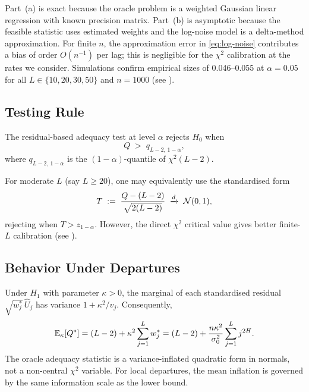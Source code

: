 \begin{remark}
    Part~(a) is exact because the oracle problem is a weighted Gaussian linear
    regression with known precision matrix.  Part~(b) is asymptotic because
    the feasible statistic uses estimated weights and the log-noise model is a
    delta-method approximation.  For finite $n$, the approximation error in
    \eqref{eq:log-noise} contributes a bias of order $O(n^{-1})$ per lag;
    this is negligible for the $\chi^2$ calibration at the rates we consider.
    Simulations confirm empirical sizes of 0.046--0.055 at $\alpha = 0.05$
    for all $L \in \{10,20,30,50\}$ and $n = 1000$ (see ).
\end{remark}

\subsection{Testing Rule}

The residual-based adequacy test at level $\alpha$ rejects $H_0$ when
\begin{equation}
    Q \;>\; q_{L-2,\,1-\alpha},
    \label{eq:test-rule}
\end{equation}
where $q_{L-2,\,1-\alpha}$ is the $(1-\alpha)$-quantile of $\chi^2(L-2)$.

For moderate $L$ (say $L \geq 20$), one may equivalently use the
standardised form
\[
    T \;:=\; \frac{Q - (L-2)}{\sqrt{2(L-2)}} \;\xrightarrow{d}\; \mathcal{N}(0,1),
\]
rejecting when $T > z_{1-\alpha}$.  However, the direct $\chi^2$ critical
value gives better finite-$L$ calibration (see ).

\subsection{Behavior Under Departures}

\begin{proposition}
\label{prop:alternative-response}
Under $H_1$ with parameter $\kappa > 0$, the marginal of each standardised
residual $\sqrt{w_j^*}\,\widehat U_j$ has variance $1 + \kappa^2/v_j$.
Consequently,
\[
    \mathbb{E}_\kappa[Q^*]
    = (L-2) + \kappa^2 \sum_{j=1}^L w_j^*
    = (L-2) + \frac{n\kappa^2}{\sigma_0^2}\sum_{j=1}^L j^{2H}.
\]
The oracle adequacy statistic is a variance-inflated quadratic form in normals,
not a non-central $\chi^2$ variable.  For local departures, the mean inflation
is governed by the same information scale as the lower bound.
\end{proposition}

